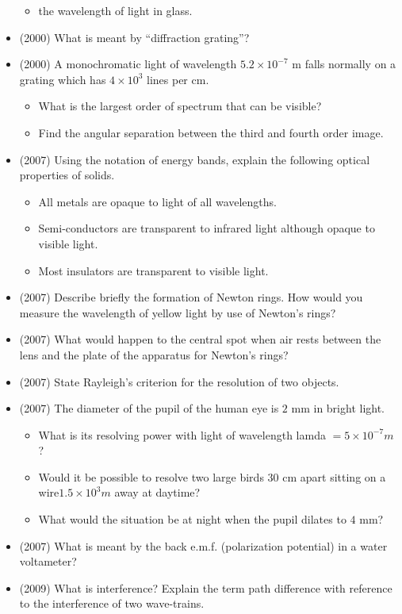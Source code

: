 \documentclass{article}
\begin{document}
\begin{itemize}
\begin{itemize}
\item the wavelength of light in glass.
\end{itemize}
\item (2000)  What is meant by “diffraction grating”?
\item (2000)  A monochromatic light of wavelength $ 5.2 \times 10^{-7}$ m falls normally on a grating which has $ 4 \times 10^{3}$ lines per cm.\begin{itemize}
\item What is the largest order of spectrum that can be visible?
\item Find the angular separation between the third and fourth order image.
\end{itemize}
\item (2007)  Using the notation of energy bands, explain the following optical properties of solids.\begin{itemize}
\item  All metals are opaque to light of all wavelengths.
\item  Semi-conductors are transparent to infrared light although opaque to visible light.
\item  Most insulators are transparent to visible light.
\end{itemize}
\item (2007)  Describe briefly the formation of Newton rings. How would you measure the wavelength of yellow light by use of Newton’s rings? 
\item (2007)  What would happen to the central spot when air rests between the lens and the plate of the apparatus for Newton’s rings? 
\item (2007)  State Rayleigh’s criterion for the resolution of two objects. 
\item (2007)  The diameter of the pupil of the human eye is $ 2$ mm in bright light.\begin{itemize}
\item What is its resolving power with light of wavelength lamda $ =5 \times 10^{-7}m$ ? 
\item Would it be possible to resolve two large birds $ 30$ cm apart sitting on a wire$ 1.5 \times 10^{3}m$ away at daytime? 
\item What would the situation be at night when the pupil dilates to $ 4$ mm? 
\end{itemize}
\item (2007)  What is meant by the back e.m.f. (polarization potential) in a water voltameter? 
\item (2009)  What is interference?  Explain the term path difference with reference to the interference of two wave-trains.

\end{itemize}
\end{document}

